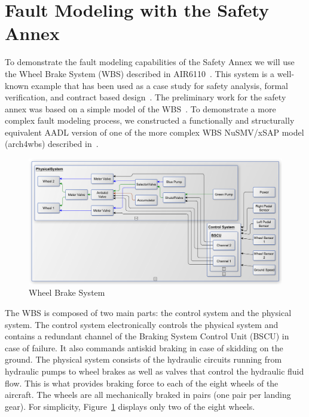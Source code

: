\section{Fault Modeling with the Safety Annex}
\label{sec:fault_modeling}

To demonstrate the fault modeling capabilities of the Safety Annex we will use the Wheel Brake System (WBS) described in AIR6110~\cite{AIR6110}.  This system is a well-known example that has been used as a case study for safety analysis, formal verification, and contract based design~\cite{DBLP:conf/cav/BozzanoCPJKPRT15, 10.1007/978-3-319-11936-6-7, CAV2015:BoCiGrMa, Joshi05:SafeComp}. The preliminary work for the safety annex was based on a simple model of the WBS~\cite{Stewart17:IMBSA}. To demonstrate a more complex fault modeling process, we constructed a functionally and structurally equivalent AADL version of one of the more complex WBS NuSMV/xSAP model (arch4wbs) described in~\cite{DBLP:conf/cav/BozzanoCPJKPRT15}.    

\begin{figure}[h!]
	\centering
	\includegraphics[trim=0 9 0 5,clip,width=\textwidth]{images/wbs_arch4_diagram.pdf}
	\caption{Wheel Brake System}
	\label{fig:wbs}
\end{figure} 

The WBS is composed of two main parts: the control system and the physical system. The control system electronically controls the physical system and contains a redundant channel of the Braking System Control Unit (BSCU) in case of failure. It also commands antiskid braking in case of skidding on the ground. The physical system consists of the hydraulic circuits running from hydraulic pumps to wheel brakes as well as valves that control the hydraulic fluid flow. This is what provides braking force to each of the eight wheels of the aircraft. The wheels are all mechanically braked in pairs (one pair per landing gear). For simplicity, Figure~\ref{fig:wbs} displays only two of the eight wheels. 

